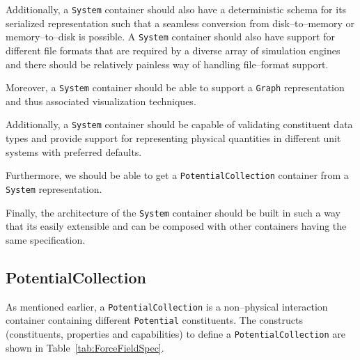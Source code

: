 \documentclass[12pt]{article}
\begin{document}
Additionally, a \texttt{System} container should also have a deterministic schema for its serialized representation such that a seamless conversion from disk--to--memory or memory--to--disk is possible. A \texttt{System} container should also have support for different file formats that are required by a diverse array of simulation engines and there should be relatively painless way of handling file--format support.

Moreover, a \texttt{System} container should be able to support a \texttt{Graph} representation and thus associated visualization techniques.

Additionally, a \texttt{System} container should be capable of validating constituent data types and provide support for representing physical quantities in different unit systems with preferred defaults.

Furthermore, we should be able to get a \texttt{PotentialCollection} container from a \texttt{System} representation.

Finally, the architecture of the \texttt{System} container should be built in such a way that its easily extensible and can be composed with other containers having the same specification.

\subsection{PotentialCollection}
\label{def:ForceField}
As mentioned earlier, a \texttt{PotentialCollection} is a non--physical interaction container containing different \texttt{Potential} constituents.  The constructs (constituents, properties and capabilities) to define a \texttt{PotentialCollection} are shown in  Table~\ref{tab:ForceFieldSpec}.
\end{document}
